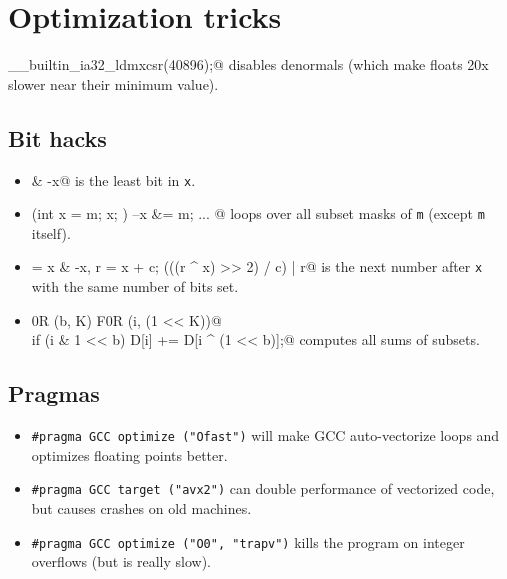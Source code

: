 \section{Optimization tricks}
	\verb@__builtin_ia32_ldmxcsr(40896);@ disables denormals (which make floats 20x slower near their minimum value).
	\subsection{Bit hacks}
		\begin{itemize}
			\item \verb@x & -x@ is the least bit in \texttt{x}.
			\item \verb@for (int x = m; x; ) { --x &= m; ... }@ loops over all subset masks of \texttt{m} (except \texttt{m} itself).
			\item \verb@c = x & -x, r = x + c; (((r ^ x) >> 2) / c) | r@ is the next number after \texttt{x} with the same number of bits set.
			\item \verb@F0R (b, K) F0R (i, (1 << K))@ \\ \verb@  if (i & 1 << b) D[i] += D[i ^ (1 << b)];@ computes all sums of subsets.
		\end{itemize}
	\subsection{Pragmas}
		\begin{itemize}
			\item \lstinline{#pragma GCC optimize ("Ofast")} will make GCC auto-vectorize loops and optimizes floating points better.
			\item \lstinline{#pragma GCC target ("avx2")} can double performance of vectorized code, but causes crashes on old machines.
			\item \lstinline{#pragma GCC optimize ("O0", "trapv")} kills the program on integer overflows (but is really slow).
		\end{itemize}

